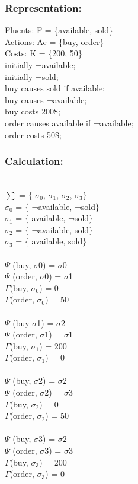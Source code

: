 \documentclass[11pt]{article}
\begin{document}
	\subsubsection{Representation:}\label{par:p202}
	\indent 
	Fluents: F = \{available, sold\}\\
	Actions: Ac = \{buy, order\}\\
	Costs: K = \{200, 50\}\\
	initially ¬available;\\
	initially ¬sold;\\
	buy causes sold if available;\\
	buy causes ¬available;\\
	buy costs 200\$;\\
	order causes available if ¬available;\\
	order costs 50\$; \\
	
	\subsubsection{Calculation:}\label{par:p302}
	\indent \\
	$ \sum $ = $ \{ $ $ \sigma _{0}$, $ \sigma _{1}$, $ \sigma _{2}$, $ \sigma _{3}$$ \} $ \\
	$ \sigma _{0}$ = $ \{ $ ¬available, ¬sold$ \} $ \\
	$ \sigma _{1}$ = $ \{ $ available, ¬sold$ \} $ \\
	$ \sigma _{2}$ = $ \{ $ ¬available, sold$ \} $ \\
	$ \sigma _{3}$ = $ \{ $ available, sold$ \} $ \\
	\\
	\(  \Psi  \)  (buy, $ \sigma $0) = $ \sigma $0\\
	\(  \Psi  \)  (order, $ \sigma $0) = $ \sigma $1\\
	\(\Gamma\)(buy, $\sigma_{0}$) = 0\\
	\(\Gamma\)(order, $\sigma_{0}$) = 50\\
	\\
	\(  \Psi  \)  (buy $ \sigma $1) = $ \sigma $2\\
	\(  \Psi  \)  (order, $ \sigma $1) = $ \sigma $1\\
	\(\Gamma\)(buy, $\sigma_{1}$) = 200\\
	\(\Gamma\)(order, $\sigma_{1}$) = 0\\
	\\
	\(  \Psi  \)  (buy, $ \sigma $2) = $ \sigma $2\\
	\(  \Psi  \)  (order, $ \sigma $2) = $ \sigma $3\\
	\(\Gamma\)(buy, $\sigma_{2}$) = 0\\
	\(\Gamma\)(order, $\sigma_{2}$) = 50\\
	\\
	\(  \Psi  \)  (buy, $ \sigma $3) = $ \sigma $2\\
	\(  \Psi  \)  (order, $ \sigma $3) = $ \sigma $3\\
	\(\Gamma\)(buy, $\sigma_{3}$) = 200\\
	\(\Gamma\)(order, $\sigma_{3}$) = 0\\
\end{document}
